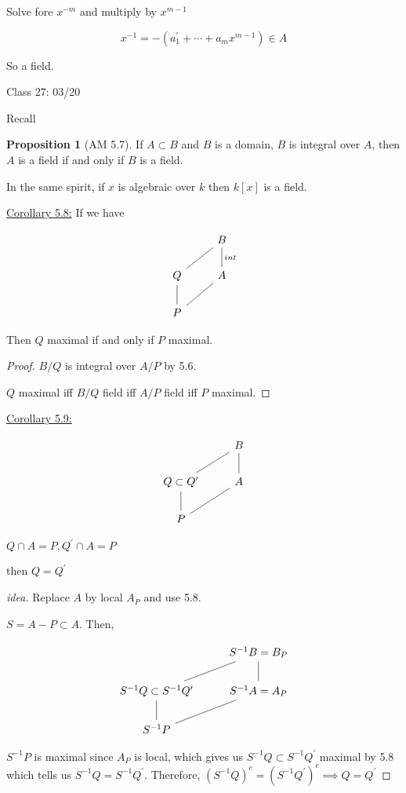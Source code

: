 \documentclass{article}
\theoremstyle{definition}
\newtheorem{proposition}{Proposition}
\begin{document}
Solve fore \(x^{-m} \) and multiply by \(x^{m-1} \) 

\[
    x ^{-1} = - (a_1^{\prime} + \cdots + a_m x^{m-1} ) \in A
\]

So a field.

\hrulefill

Class 27: 03/20

Recall

\begin{proposition}
    [AM 5.7]

    If \(A \subset B\) and \(B\) is a domain, \(B\) is integral over \(A\), then \(A\) is a field if and only if \(B\) is a field.
\end{proposition}

In the same spirit, if \(x\) is algebraic over \(k\) then \(k[x]\) is a field.

\underline{Corollary 5.8:} If we have

\[
    \begin{tikzcd}
        & B \\
        Q \ar[ur, no head] & A \ar[u, no head, "int", swap]\\
        P \ar[u, no head] \ar[ur, no head] &
    \end{tikzcd}
\]

Then \(Q\) maximal if and only if \(P\) maximal.

\begin{proof}
    \(B / Q\) is integral over \(A / P\) by 5.6.

    \(Q\) maximal iff \(B / Q\) field iff \(A / P\) field iff \(P\) maximal.
\end{proof}

\underline{Corollary 5.9:} 

\[
    \begin{tikzcd}
        & B\\
        Q \subset Q^{\prime} \ar[ur, no head] & A \ar[u, no head]\\
        P \ar[u, no head] \ar[ur, no head] &
    \end{tikzcd}
\]

\(Q\cap A = P, Q^{\prime} \cap A = P\) 

then \(Q = Q^{\prime}\) 

\begin{proof}
    [idea] Replace \(A\) by local \(A_P\) and use 5.8.

    \(S = A - P \subset A\). Then,
    
    \[
        \begin{tikzcd}
            & S ^{-1} B = B_P \\
            S ^{-1} Q \subset S ^{-1} Q^{\prime} \ar[ur, no head] & S ^{-1} A = A_P \ar[u, no head] \\
            S ^{-1} P \ar[u, no head] \ar[ur, no head] &
        \end{tikzcd}
    \]

    \(S ^{-1} P\) is maximal since \(A_P\) is local, which gives us \(S ^{-1} Q \subset S ^{-1} Q^{\prime} \) maximal by 5.8 which tells us \(S ^{-1} Q = S ^{-1} Q^{\prime} \). Therefore, \((S ^{-1} Q)^c = (S ^{-1} Q^{\prime} )^c \implies Q = Q^{\prime} \)     
\end{proof}
\end{document}
